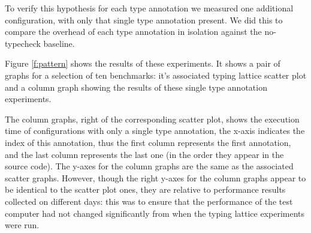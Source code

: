 \documentclass[sigplan,10pt,review,screen]{acmart}\settopmatter{printfolios=true}
\begin{document}

To verify this hypothesis 
for each type annotation we measured one additional
configuration, with only that single type annotation present.
We did this to compare the overhead of
each type annotation in isolation against the no-typecheck baseline.

Figure \ref{f:pattern} shows the results of these experiments.
It shows a pair of graphs for a selection of ten benchmarks: it's associated typing lattice scatter plot and a column graph showing the results of these single type annotation experiments.

The column graphs, right of the corresponding scatter plot, shows the execution time of configurations with only a single type annotation, the x-axis indicates the index of this annotation, thus the first column represents the first annotation, and the last column represents the last one (in the order they appear in the source code). The y-axes for the column graphs are the same as the associated scatter graphs. However, though the right y-axes for the column graphs appear to be identical to the scatter plot ones, they are relative to performance results collected on different days: this was to ensure that the performance of the test computer had not changed significantly from when the typing lattice experiments were run.

\end{document}

